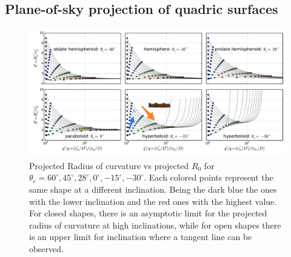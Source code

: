 
\subsection{Plane-of-sky projection of quadric surfaces} 
\begin{figure}
\includegraphics[width=0.9\linewidth]{annotated}
\caption{Projected Radius of curvature vs projected $R_0$ for $\theta_c=60^\circ,45^\circ,28^\circ, 0^\circ,-15^\circ,-30^\circ$. Each colored points represent
the same shape at a different inclination. Being the dark blue the ones with the lower inclination and the red ones with the highest value. For closed shapes, there is
an asymptotic limit for the projected radius of curvature at high inclinations, while for open shapes there is an upper limit for inclination where a tangent line can be observed.}
\label{fig:Apqp}
\end{figure}

